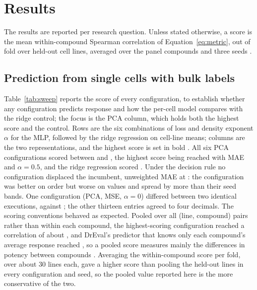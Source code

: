 \section{Results}
\label{sec:results}

The results are reported per research question. Unless stated otherwise, a score is the mean
within-compound Spearman correlation of Equation~\ref{eq:metric}, out of fold over held-out cell lines,
averaged over the \NPanel{} panel compounds and three seeds \cite{spearman1904,dreval}.

\subsection{Prediction from single cells with bulk labels}
\label{sec:results-q1}

Table~\ref{tab:sweep} reports the score of every configuration, to establish whether any configuration
predicts response and how the per-cell model compares with the ridge control; the focus is the PCA
column, which holds both the highest score and the control. Rows are the six combinations of loss and
density exponent $\alpha$ for the MLP, followed by the ridge regression on cell-line means; columns are
the two representations, and the highest score is set in bold \cite{hoerl1970,dir}. All six PCA
configurations scored between \SpSweepLo{} and \SpBest{}, the highest score being reached with MAE and
$\alpha = 0.5$, and the ridge regression scored \RidgePca{}. Under the decision rule no configuration
displaced the incumbent, unweighted MAE at \SwPcaMaeZero{}: the \SpBest{} configuration was better on order
but worse on values and spread by more than their seed bands.
One configuration (PCA, MSE, $\alpha = 0$) differed between two identical
executions, \SwPcaMseZeroAlt{} against \SpSweepLo{}; the other thirteen entries agreed to four decimals.
The scoring conventions behaved as expected. Pooled over all (line, compound) pairs rather than within
each compound, the highest-scoring configuration reached a correlation of about \SpPooled{}, and
DrEval's predictor that knows only each compound's average response reached \DrDrugMean{}, so a pooled
score measures mainly the differences in potency between compounds \cite{dreval}. Averaging the
within-compound score per fold, over about 30 lines each, gave a higher score than pooling the held-out
lines in every configuration and seed, so the pooled value reported here is the more conservative of
the two.

